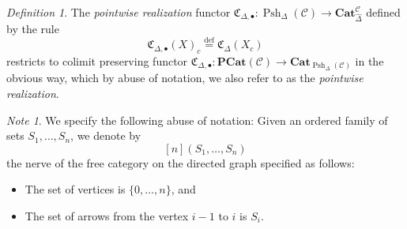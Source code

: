 \documentclass[leqno]{article}
\numberwithin{equation}{subsection}
\theoremstyle{plain}   %
\theoremstyle{remark}
\newtheorem{note}[equation]{Note}
\newtheorem{defn}[equation]{Definition}
\theoremstyle{plain}
\newcommand{\Cat}{\ensuremath{\mathbf{Cat}}}
\newcommand{\psh}[1]{\ensuremath{\widehat{#1}}}
\newcommand{\C}{\ensuremath{\mathcal{C}}}
\newcommand{\defeq}{\overset{\mathrm{def}}=}
\newcommand{\spsh}{\ensuremath{\operatorname{Psh}_\Delta(\mathcal{C})}}
\begin{document}
\begin{defn}\label{pointwisedefn}
	The \emph{pointwise realization} functor \(\mathfrak{C}_{\Delta,\bullet}: \spsh \to \Cat_{\psh{\Delta}}^\C\) defined by the rule 
	\[
		\mathfrak{C}_{\Delta,\bullet}(X)_c \defeq \mathfrak{C}_{\Delta}(X_c)
	\]
		restricts to colimit preserving functor \(\mathfrak{C}_{\Delta,\bullet}: \mathbf{PCat}(\C) \to \Cat_{\spsh}\) in the obvious way, which by abuse of notation, we also refer to as the \emph{pointwise realization}.
\end{defn}

\begin{note}
	We specify the following abuse of notation: Given an ordered family of sets \(S_1,\dots, S_n\), we denote by
	\[
		[n](S_1,\dots,S_n)
	\]
	the nerve of the free category on the directed graph specified as follows:
	\begin{itemize}
		\item The set of vertices is \(\{0,\dots,n\}\), and
		\item The set of arrows from the vertex \(i-1\) to \(i\) is \(S_i\).
	\end{itemize}
\end{note}
\end{document}
